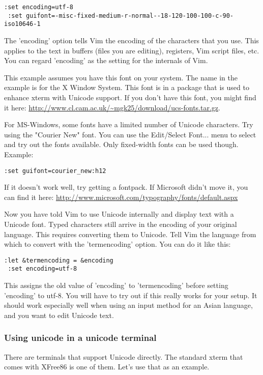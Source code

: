 \begin{Verbatim}[samepage=true]
 :set encoding=utf-8
 :set guifont=-misc-fixed-medium-r-normal--18-120-100-100-c-90-iso10646-1
\end{Verbatim}

The 'encoding' option tells Vim the encoding of the characters that you use.
This applies to the text in buffers (files you are editing), registers, Vim script files, etc.
You can regard 'encoding' as the setting for the internals of Vim.

This example assumes you have this font on your system.
The name in the example is for the X Window System.
This font is in a package that is used to enhance xterm with Unicode support.
If you don't have this font, you might find it here: \url{http://www.cl.cam.ac.uk/~mgk25/download/ucs-fonts.tar.gz}.

For MS-Windows, some fonts have a limited number of Unicode characters.
Try using the "Courier New" font.
You can use the Edit/Select Font... menu to select and try out the fonts available.
Only fixed-width fonts can be used though.
Example:

\begin{Verbatim}[samepage=true]
 :set guifont=courier_new:h12
\end{Verbatim}

If it doesn't work well, try getting a fontpack.
If Microsoft didn't move it, you can find it here: \url{http://www.microsoft.com/typography/fonts/default.aspx}

Now you have told Vim to use Unicode internally and display text with a Unicode font.
Typed characters still arrive in the encoding of your original language.
This requires converting them to Unicode.
Tell Vim the language from which to convert with the 'termencoding' option.
You can do it like this:

\begin{Verbatim}[samepage=true]
 :let &termencoding = &encoding
 :set encoding=utf-8
\end{Verbatim}

This assigns the old value of 'encoding' to 'termencoding' before setting 'encoding' to utf-8.
You will have to try out if this really works for your setup.
It should work especially well when using an input method for an Asian language, and you want to edit Unicode text.

\subsubsection{Using unicode in a unicode terminal}
There are terminals that support Unicode directly.
The standard xterm that comes with XFree86 is one of them.
Let's use that as an example.

